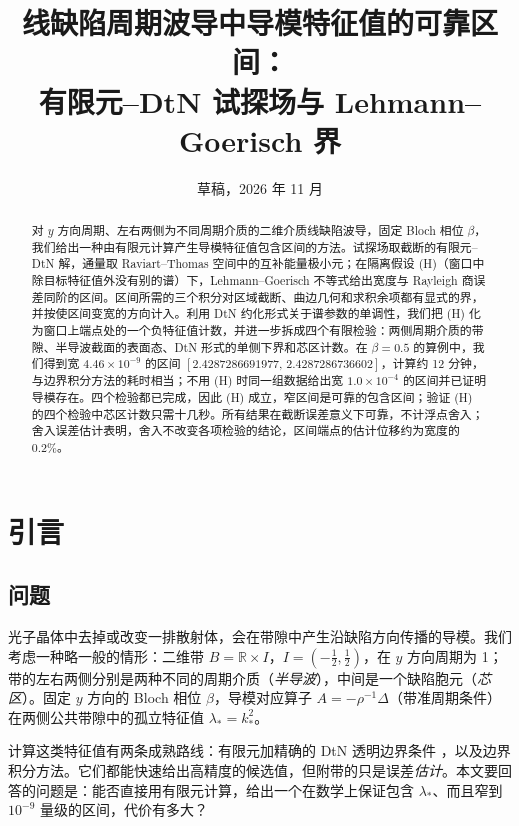 \documentclass[11pt,a4paper,fontset=fandol]{ctexart}
\title{线缺陷周期波导中导模特征值的可靠区间：\\有限元--DtN 试探场与 Lehmann--Goerisch 界}
\author{}
\date{草稿，2026 年 11 月}
\newcommand{\RR}{\mathbb R}
\theoremstyle{plain}
\theoremstyle{definition}
\theoremstyle{remark}
\begin{document}
\maketitle

\begin{abstract}
对 $y$ 方向周期、左右两侧为不同周期介质的二维介质线缺陷波导，固定 Bloch 相位 $\beta$，我们给出一种由有限元计算产生导模特征值包含区间的方法。试探场取截断的有限元--DtN 解，通量取 Raviart--Thomas 空间中的互补能量极小元；在隔离假设 (H)（窗口中除目标特征值外没有别的谱）下，Lehmann--Goerisch 不等式给出宽度与 Rayleigh 商误差同阶的区间。区间所需的三个积分对区域截断、曲边几何和求积余项都有显式的界，并按使区间变宽的方向计入。利用 DtN 约化形式关于谱参数的单调性，我们把 (H) 化为窗口上端点处的一个负特征值计数，并进一步拆成四个有限检验：两侧周期介质的带隙、半导波截面的表面态、DtN 形式的单侧下界和芯区计数。在 $\beta=0.5$ 的算例中，我们得到宽 $4.46\times10^{-9}$ 的区间 $[2.4287286691977,\,2.4287286736602]$，计算约 12 分钟，与边界积分方法的耗时相当；不用 (H) 时同一组数据给出宽 $1.0\times10^{-4}$ 的区间并已证明导模存在。四个检验都已完成，因此 (H) 成立，窄区间是可靠的包含区间；验证 (H) 的四个检验中芯区计数只需十几秒。所有结果在截断误差意义下可靠，不计浮点舍入；舍入误差估计表明，舍入不改变各项检验的结论，区间端点的估计位移约为宽度的 $0.2\%$。
\end{abstract}

\section{引言}
\label{sec:intro}
\subsection*{问题}

光子晶体中去掉或改变一排散射体，会在带隙中产生沿缺陷方向传播的导模。我们考虑一种略一般的情形：二维带 $B=\RR\times I$，$I=(-\tfrac12,\tfrac12)$，在 $y$ 方向周期为 1；带的左右两侧分别是两种不同的周期介质（\emph{半导波}），中间是一个缺陷胞元（\emph{芯区}）。固定 $y$ 方向的 Bloch 相位 $\beta$，导模对应算子 $A=-\rho^{-1}\Delta$（带准周期条件）在两侧公共带隙中的孤立特征值 $\lambda_*=k_*^2$。

计算这类特征值有两条成熟路线：有限元加精确的 DtN 透明边界条件 \cite{JolyLiFliss2006,Fliss2013,KlindworthSchmidtFliss2014,FlissJolyLescarret2021}，以及边界积分方法。它们都能快速给出高精度的候选值，但附带的只是误差\emph{估计}。本文要回答的问题是：能否直接用有限元计算，给出一个在数学上保证包含 $\lambda_*$、而且窄到 $10^{-9}$ 量级的区间，代价有多大？
\end{document}
